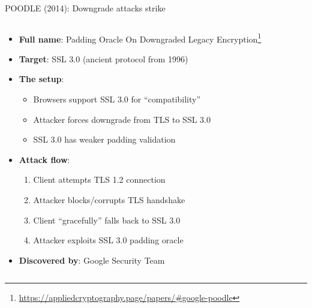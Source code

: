 \documentclass[aspectratio=169, lualatex, handout]{beamer}
\begin{document}
\begin{frame}{POODLE (2014): Downgrade attacks strike}
	\begin{columns}[c]
		\begin{column}{1\textwidth}
			\begin{itemize}[<+->]
				\item \textbf{Full name}: Padding Oracle On Downgraded Legacy Encryption\footnote{\url{https://appliedcryptography.page/papers/\#google-poodle}}
				\item \textbf{Target}: SSL 3.0 (ancient protocol from 1996)
				\item \textbf{The setup}:
				      \begin{itemize}
					      \item Browsers support SSL 3.0 for ``compatibility''
					      \item Attacker forces downgrade from TLS to SSL 3.0
					      \item SSL 3.0 has weaker padding validation
				      \end{itemize}
				\item \textbf{Attack flow}:
				      \begin{enumerate}
					      \item Client attempts TLS 1.2 connection
					      \item Attacker blocks/corrupts TLS handshake
					      \item Client ``gracefully'' falls back to SSL 3.0
					      \item Attacker exploits SSL 3.0 padding oracle
				      \end{enumerate}
				\item \textbf{Discovered by}: Google Security Team
			\end{itemize}
		\end{column}
	\end{columns}
\end{frame}
\end{document}
